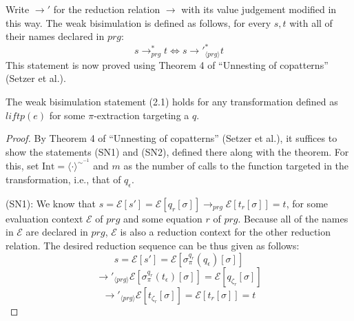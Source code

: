 Write $\longrightarrow'$ for the reduction relation $\longrightarrow$ with its value judgement modified in this way. The weak bisimulation is defined as follows, for every $s,t$ with all of their names declared in $prg$:
\begin{equation}
s \longrightarrow_{prg}^* t \iff s {\longrightarrow'}_{\langle prg \rangle}^* t
\end{equation}
This statement is now proved using Theorem 4 of ``Unnesting of copatterns'' (Setzer et al.).

\begin{proposition}
The weak bisimulation statement (2.1) holds for any transformation defined as $liftp(e)$ for some $\pi$-extraction targeting a $q$.

\begin{proof}
By Theorem 4 of ``Unnesting of copatterns'' (Setzer et al.), it suffices to show the statements (SN1) and (SN2), defined there along with the theorem. For this, set $\textrm{Int} = \langle \cdot \rangle^{\sim^{-1}}$ and $m$ as the number of calls to the function targeted in the transformation, i.e., that of $q_\epsilon$.

(SN1): We know that $s = \mathcal{E}[s'] = \mathcal{E}[q_r[\sigma]] \longrightarrow_{prg} \mathcal{E}[t_r[\sigma]] = t$, for some evaluation context $\mathcal{E}$ of $prg$ and some equation $r$ of $prg$. Because all of the names in $\mathcal{E}$ are declared in $prg$, $\mathcal{E}$ is also a reduction context for the other reduction relation. The desired reduction sequence can be thus given as follows:
\[
s = \mathcal{E}[s'] = \mathcal{E}[\sigma^{q_r}_\pi(q_\epsilon)[\sigma]]
\]
\[
\longrightarrow'_{\langle prg \rangle} \mathcal{E}[\sigma^{q_r}_\pi(t_\epsilon)[\sigma]] = \mathcal{E}[q_{\zeta_r}[\sigma]]
\]
\[
\longrightarrow'_{\langle prg \rangle} \mathcal{E}[t_{\zeta_r}[\sigma]] = \mathcal{E}[t_r[\sigma]] = t
\]


\end{proof}
\end{proposition}
